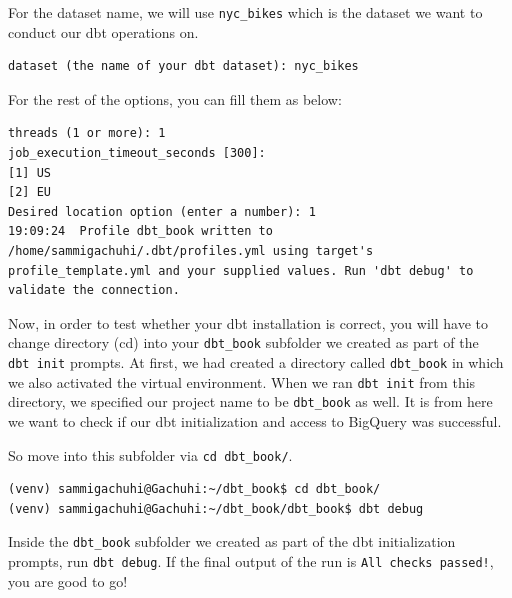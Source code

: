 \documentclass[
]{book}
\begin{document}
For the dataset name, we will use \texttt{nyc\_bikes} which is the dataset we want to conduct our dbt operations on.

\begin{verbatim}
dataset (the name of your dbt dataset): nyc_bikes
\end{verbatim}

For the rest of the options, you can fill them as below:

\begin{verbatim}
threads (1 or more): 1
job_execution_timeout_seconds [300]: 
[1] US
[2] EU
Desired location option (enter a number): 1
19:09:24  Profile dbt_book written to /home/sammigachuhi/.dbt/profiles.yml using target's profile_template.yml and your supplied values. Run 'dbt debug' to validate the connection.
\end{verbatim}

Now, in order to test whether your dbt installation is correct, you will have to change directory (cd) into your \texttt{dbt\_book} subfolder we created as part of the \texttt{dbt\ init} prompts. At first, we had created a directory called \texttt{dbt\_book} in which we also activated the virtual environment. When we ran \texttt{dbt\ init} from this directory, we specified our project name to be \texttt{dbt\_book} as well. It is from here we want to check if our dbt initialization and access to BigQuery was successful.

So move into this subfolder via \texttt{cd\ dbt\_book/}.

\begin{verbatim}
(venv) sammigachuhi@Gachuhi:~/dbt_book$ cd dbt_book/
(venv) sammigachuhi@Gachuhi:~/dbt_book/dbt_book$ dbt debug
\end{verbatim}

Inside the \texttt{dbt\_book} subfolder we created as part of the dbt initialization prompts, run \texttt{dbt\ debug}. If the final output of the run is \texttt{All\ checks\ passed!}, you are good to go!
\end{document}
